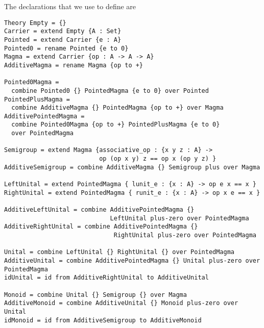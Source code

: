 The declarations that we use to define  are 
\begin{verbatim} 
Theory Empty = {} 
Carrier = extend Empty {A : Set}
Pointed = extend Carrier {e : A}
Pointed0 = rename Pointed {e to 0} 
Magma = extend Carrier {op : A -> A -> A}
AdditiveMagma = rename Magma {op to +} 

Pointed0Magma = 
  combine Pointed0 {} PointedMagma {e to 0} over Pointed
PointedPlusMagma = 
  combine AdditiveMagma {} PointedMagma {op to +} over Magma
AdditivePointedMagma = 
  combine Pointed0Magma {op to +} PointedPlusMagma {e to 0} 
  over PointedMagma

Semigroup = extend Magma {associative_op : {x y z : A} -> 
                          op (op x y) z == op x (op y z) }
AdditiveSemigroup = combine AdditiveMagma {} Semigroup plus over Magma

LeftUnital = extend PointedMagma { lunit_e : {x : A} -> op e x == x }
RightUnital = extend PointedMagma { runit_e : {x : A} -> op x e == x }

AdditiveLeftUnital = combine AdditivePointedMagma {} 
                             LeftUnital plus-zero over PointedMagma 
AdditiveRightUnital = combine AdditivePointedMagma {} 
                              RightUnital plus-zero over PointedMagma 

Unital = combine LeftUnital {} RightUnital {} over PointedMagma
AdditiveUnital = combine AdditivePointedMagma {} Unital plus-zero over PointedMagma
idUnital = id from AdditiveRightUnital to AdditiveUnital 

Monoid = combine Unital {} Semigroup {} over Magma
AdditiveMonoid = combine AdditiveUnital {} Monoid plus-zero over Unital 
idMonoid = id from AdditiveSemigroup to AdditiveMonoid   
\end{verbatim} 

